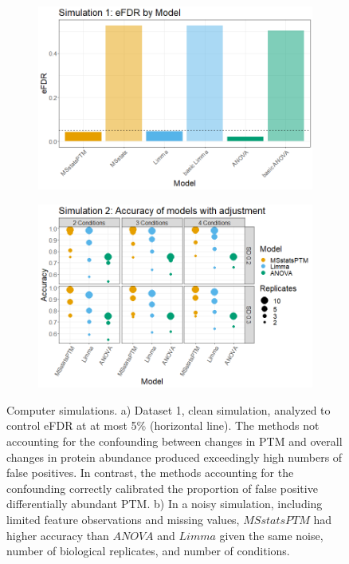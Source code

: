 \documentclass[mcp]{article}
\numberwithin{table}{section}
\begin{document}
\begin{figure}[ht]
\centering
\begin{subfigure}[c]{0.7\linewidth}
\includegraphics[width=1\textwidth]{images/sim1_FDR_all_models.png}
\caption{}
\label{fig:sim1_fdr}
\end{subfigure}
\begin{subfigure}[c]{0.825\linewidth}
\includegraphics[width=1\textwidth]{images/sim3_Accuracy.png}
\caption{}
\label{fig:sim2_acc}
\end{subfigure}
\caption{Computer simulations. a) Dataset 1, clean simulation, analyzed to control eFDR at at most 5\% (horizontal line). The methods not accounting for the confounding between changes in PTM and overall changes in protein abundance produced exceedingly high numbers of false positives. In contrast, the methods accounting for the confounding correctly calibrated the proportion of false positive differentially abundant PTM.  b) In a noisy simulation, including limited feature observations and missing values, $MSstatsPTM$ had higher accuracy than $ANOVA$ and $Limma$ given the same noise, number of biological replicates, and number of conditions.
}
\label{fig:computer_sim}
\end{figure}
\end{document}
